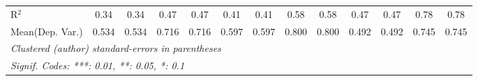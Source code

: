 \begin{tabular}{lcccccccccccc}
   R$^2$                                    & 0.34          & 0.34          & 0.47        & 0.47         & 0.41          & 0.41          & 0.58         & 0.58          & 0.47         & 0.47         & 0.78          & 0.78\\  
Mean(Dep. Var.) & 0.534 & 0.534 & 0.716 & 0.716 & 0.597 & 0.597 & 0.800 & 0.800 & 0.492 & 0.492 & 0.745 & 0.745 \\
   \midrule \midrule
   \multicolumn{13}{l}{\emph{Clustered (author) standard-errors in parentheses}}\\
   \multicolumn{13}{l}{\emph{Signif. Codes: ***: 0.01, **: 0.05, *: 0.1}}\\
\end{tabular}
\par\endgroup
